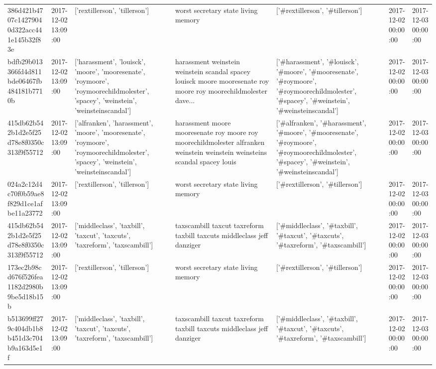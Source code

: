 \begin{tabular}{lllllll}
386d421b4707c14279040d322acc441e145b32f83e & 2017-12-02 13:09:00 & ['rextillerson', 'tillerson'] & worst secretary state living memory & ['#rextillerson', '#tillerson'] & 2017-12-02 00:00:00 & 2017-12-03 00:00:00 \\
bdfb29b013366fd4d811bde06467fb484181b7710b & 2017-12-02 13:09:00 & ['harassment', 'louisck', 'moore', 'mooresenate', 'roymoore', 'roymoorechildmolester', 'spacey', 'weinstein', 'weinsteinscandal'] & harassment weinstein weinstein scandal spacey louisck moore mooresenate roy moore roy moorechildmolester dave... & ['#harassment', '#louisck', '#moore', '#mooresenate', '#roymoore', '#roymoorechildmolester', '#spacey', '#weinstein', '#weinsteinscandal'] & 2017-12-02 00:00:00 & 2017-12-03 00:00:00 \\
415db62b542b1d2e5f25d78e8f0350c313f9f55712 & 2017-12-02 13:09:00 & ['alfranken', 'harassment', 'moore', 'mooresenate', 'roymoore', 'roymoorechildmolester', 'spacey', 'weinstein', 'weinsteinscandal'] & harassment moore mooresenate roy moore roy moorechildmolester alfranken weinstein weinstein weinsteins scandal spacey louis & ['#alfranken', '#harassment', '#moore', '#mooresenate', '#roymoore', '#roymoorechildmolester', '#spacey', '#weinstein', '#weinsteinscandal'] & 2017-12-02 00:00:00 & 2017-12-03 00:00:00 \\
024a2c12d4c70f0b59ae8f829d1ce1afbe11a23772 & 2017-12-02 13:09:00 & ['rextillerson', 'tillerson'] & worst secretary state living memory & ['#rextillerson', '#tillerson'] & 2017-12-02 00:00:00 & 2017-12-03 00:00:00 \\
415db62b542b1d2e5f25d78e8f0350c313f9f55712 & 2017-12-02 13:09:00 & ['middleclass', 'taxbill', 'taxcut', 'taxcuts', 'taxreform', 'taxscambill'] & taxscambill taxcut taxreform taxbill taxcuts middleclass jeff danziger & ['#middleclass', '#taxbill', '#taxcut', '#taxcuts', '#taxreform', '#taxscambill'] & 2017-12-02 00:00:00 & 2017-12-03 00:00:00 \\
173ec2b98cd676f526fea1182d2980b9be5d18b15b & 2017-12-02 13:09:00 & ['rextillerson', 'tillerson'] & worst secretary state living memory & ['#rextillerson', '#tillerson'] & 2017-12-02 00:00:00 & 2017-12-03 00:00:00 \\
b513699ff279c404db1b8b451d3c704b9a163d5e1f & 2017-12-02 13:09:00 & ['middleclass', 'taxbill', 'taxcut', 'taxcuts', 'taxreform', 'taxscambill'] & taxscambill taxcut taxreform taxbill taxcuts middleclass jeff danziger & ['#middleclass', '#taxbill', '#taxcut', '#taxcuts', '#taxreform', '#taxscambill'] & 2017-12-02 00:00:00 & 2017-12-03 00:00:00 \\

\end{tabular}
